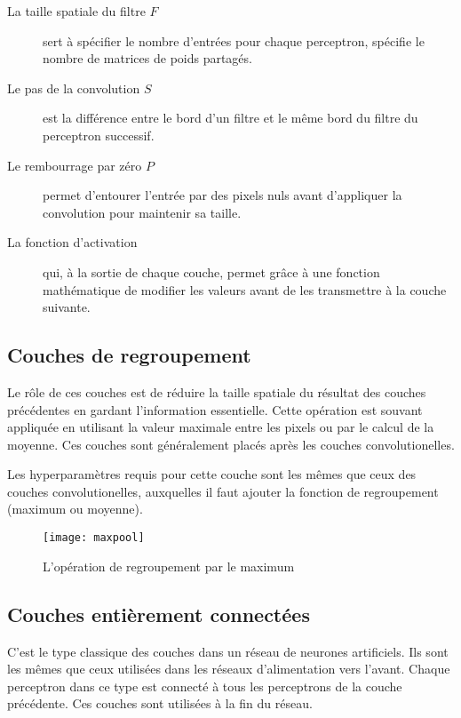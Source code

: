 \begin{description}
  \item[La taille spatiale du filtre $F$] sert à
  spécifier le nombre d'entrées pour chaque perceptron,
   spécifie
  le nombre de matrices de poids partagés.
  \item[Le pas de la convolution $S$] est la différence entre le bord d'un
  filtre et le même bord du filtre du perceptron successif.
  \item[Le rembourrage par zéro $P$] permet d'entourer
  l'entrée par des pixels nuls avant d'appliquer la convolution pour maintenir
  sa taille.
  \item[La fonction d'activation] qui, à la sortie de chaque couche, permet grâce
  à une fonction mathématique de modifier les valeurs avant de les transmettre à la
  couche suivante.
\end{description}

\subsection{Couches de regroupement}

Le rôle de ces couches est de réduire la taille spatiale du résultat des couches
précédentes en gardant l'information essentielle. Cette opération est souvant
appliquée en utilisant la valeur maximale entre les pixels ou par le calcul de
la moyenne. Ces couches sont généralement placés après les couches
convolutionelles.

Les hyperparamètres requis pour cette couche sont les mêmes que ceux des couches
convolutionelles, auxquelles il faut ajouter la fonction de regroupement
(maximum ou moyenne).

\begin{figure}[h]
\begin{center}
\texttt{[image: maxpool]}
\caption{L'opération de regroupement par le maximum}{\cite{karpathy2016cs231n}}
\end{center}
\end{figure}

\subsection{Couches entièrement connectées}

C'est le type classique des couches dans un réseau de neurones artificiels. Ils
sont les mêmes que ceux utilisées dans les réseaux d'alimentation vers l'avant.
Chaque perceptron dans ce type est connecté à tous les perceptrons de la couche
précédente. Ces couches sont utilisées à la fin du réseau.

